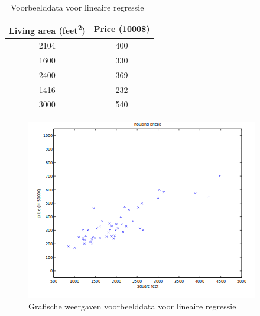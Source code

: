 \begin{table}[ht]
    \caption{Voorbeelddata voor lineaire regressie~\autocite{Pant2019}}
    \centering
    \begin{tabular}{|c|c|} 
        \hline     
        Living area (feet\textsuperscript{2}) & Price (1000\$) \\ [0.5ex] 
        \hline\hline
        2104 & 400 \\  [0.3ex]
        \hline
        1600 & 330 \\ [0.3ex]
        \hline
        2400 & 369 \\ [0.3ex]
        \hline
        1416 & 232 \\ [0.3ex]
        \hline
        3000 & 540 \\ [0.3ex]
        \hline
    \end{tabular}
    \label{Tab:Tcr}
\end{table}

\begin{figure}[!h]
    \centering
    \caption{Grafische weergaven voorbeelddata voor lineaire regressie~\autocite{Pant2019}}
    \label{fig:ExampleDataLinearRegressionGraph}
    \includegraphics[width=0.7\linewidth]{ExampleDataLinearRegressionGraph}
\end{figure}


\subsection{}

